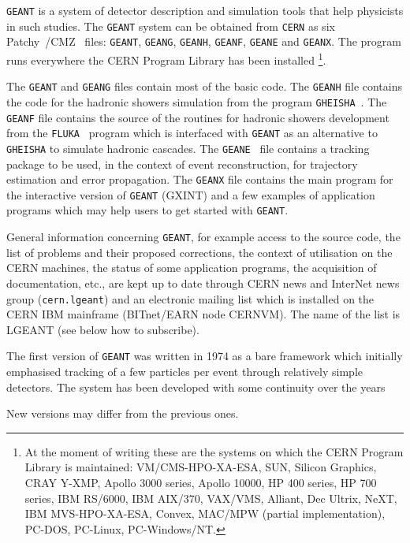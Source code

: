 {\tt GEANT} is a system of detector description and simulation tools that
help physicists in such studies.
The {\tt GEANT} system can be obtained from {\tt CERN} as six 
Patchy~\cite{bib-PATCHY}/CMZ~\cite{bib-CMZ} files:
{\tt GEANT}, {\tt GEANG}, {\tt GEANH}, {\tt GEANF}, {\tt GEANE} and {\tt GEANX}.
The program runs everywhere the CERN Program Library has been installed
\footnote{
At the moment of writing these are the systems on which the CERN Program
Library is maintained: VM/CMS-HPO-XA-ESA, SUN, Silicon Graphics,
CRAY Y-XMP, Apollo 3000 series, Apollo 10000, HP 400 series, HP 700 series,
IBM RS/6000, IBM AIX/370, VAX/VMS, Alliant, Dec Ultrix, NeXT,
IBM MVS-HPO-XA-ESA, Convex, MAC/MPW (partial implementation), 
PC-DOS, PC-Linux, PC-Windows/NT.
}.
\par
The {\tt GEANT} and
{\tt GEANG} files contain most of the basic code. The {\tt GEANH} file
contains the code for the
hadronic showers simulation from the program {\tt GHEISHA}~\cite{bib-GHEI}.
The {\tt GEANF} file contains the source of the routines for hadronic
showers development from the 
{\tt FLUKA}~\cite{bib-FLUK,bib-FLU1,bib-FLU2,bib-FLU3,bib-FLU4,bib-FLU5,bib-FLU6}
program which is interfaced with {\tt GEANT} as an alternative to 
{\tt GHEISHA} to simulate hadronic cascades.
The {\tt GEANE}~\cite{bib-GEANE} file
contains a tracking package to be used, in the context of
event reconstruction, for trajectory estimation and error propagation.
The {\tt GEANX} file
contains
the main program for the interactive version of {\tt GEANT} (GXINT) and
a few examples of application
programs which may help users to get started with {\tt GEANT}.
\par
General information concerning {\tt GEANT}, for example
access to the source code, the list of problems and their
proposed corrections, the context of utilisation on the
CERN machines, the status of some application programs, the acquisition of
documentation, etc., are kept up to date through CERN news and
InterNet news group ({\tt cern.lgeant}) and an
electronic mailing list which is installed on the CERN IBM mainframe
(BITnet/EARN node CERNVM). The name of the list is LGEANT (see below how
to subscribe).
\par
The first version of {\tt GEANT} was written in 1974 as a bare
framework which initially emphasised tracking
of a few particles per event through relatively
simple detectors. The system has been developed
with some continuity over the years~\cite{bib-GEANT2}
\par
New versions may
differ from the previous ones.
